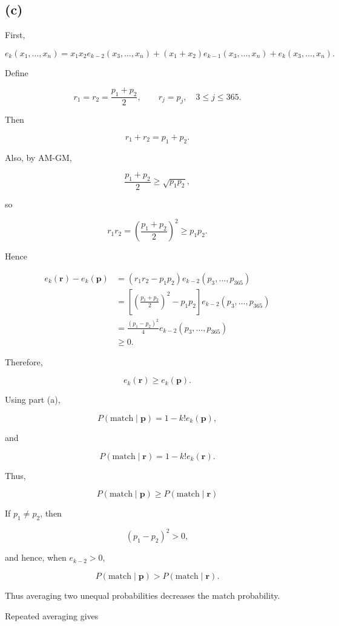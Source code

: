 \documentclass{article}
\begin{document}
\subsection*{(c)}

First,

\[
e_k(x_1,\ldots,x_n)
=
x_1x_2e_{k-2}(x_3,\ldots,x_n)
+
(x_1+x_2)e_{k-1}(x_3,\ldots,x_n)
+
e_k(x_3,\ldots,x_n).
\]

Define

\[
r_1=r_2=\frac{p_1+p_2}{2},
\qquad
r_j=p_j,\quad 3\le j\le365.
\]

Then

\[
r_1+r_2=p_1+p_2.
\]

Also, by AM-GM,

\[
\frac{p_1+p_2}{2}\ge\sqrt{p_1p_2},
\]

so

\[
r_1r_2
=
\left(\frac{p_1+p_2}{2}\right)^2
\ge
p_1p_2.
\]

Hence

\[
\begin{aligned}
e_k(\mathbf r)-e_k(\mathbf p)
&=
(r_1r_2-p_1p_2)
e_{k-2}(p_3,\ldots,p_{365})\\
&=
\left[
\left(\frac{p_1+p_2}{2}\right)^2-p_1p_2
\right]
e_{k-2}(p_3,\ldots,p_{365})\\
&=
\frac{(p_1-p_2)^2}{4}
e_{k-2}(p_3,\ldots,p_{365})\\
&\ge0.
\end{aligned}
\]

Therefore,

\[
e_k(\mathbf r)\ge e_k(\mathbf p).
\]

Using part (a),

\[
P(\text{match}\mid\mathbf p)
=
1-k!e_k(\mathbf p),
\]

and

\[
P(\text{match}\mid\mathbf r)
=
1-k!e_k(\mathbf r).
\]

Thus,

\[
P(\text{match}\mid\mathbf p)
\ge
P(\text{match}\mid\mathbf r)
\]

If \(p_1\ne p_2\), then

\[
(p_1-p_2)^2>0,
\]

and hence, when \(e_{k-2}>0\),

\[
P(\text{match}\mid\mathbf p)
>
P(\text{match}\mid\mathbf r).
\]

Thus averaging two unequal probabilities decreases the match probability.

Repeated averaging gives
\end{document}
